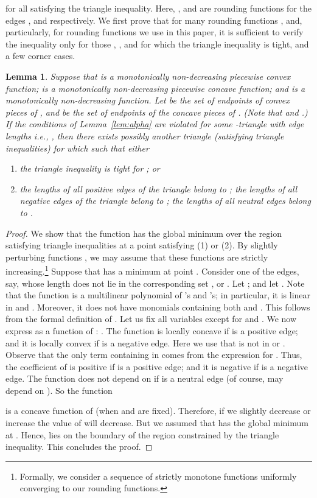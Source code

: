 \documentclass[11pt]{article}
\newtheorem{lemma}[theorem]{Lemma}
\theoremstyle{definition}
\theoremstyle{remark}
\begin{document}
for all 
satisfying the triangle
inequality. Here, ,  and  are rounding functions for
the edges ,  and  respectively. We first prove that for
many rounding functions , and, particularly, for rounding functions we use
in this paper, it is sufficient to verify the inequality  only for
those , , and  for which the triangle inequality is
tight, and a few corner cases.

\begin{lemma}\label{lem:tight-triangle}
Suppose that  is a monotonically non-decreasing piecewise convex
function;  is a monotonically non-decreasing piecewise concave function;
and  is a monotonically non-decreasing function. Let  be the set of
endpoints of convex pieces of , and  be the set of endpoints of the
concave pieces of . (Note that  and .) If the conditions of Lemma~\ref{lem:alpha} are violated for some
-triangle with edge lengths  i.e., , then there exists possibly
another triangle  (satisfying triangle inequalities)
for which  such that either
\begin{enumerate}
\item the triangle inequality is tight for ; or
\item the lengths of all positive edges of the triangle belong to ;
the lengths of all negative edges of the triangle belong to ; the lengths
of all neutral edges belong to .
\end{enumerate}
\end{lemma}
\begin{proof}
We show that the function  has the global minimum over the region
satisfying triangle inequalities at a point 
satisfying (1) or (2). By slightly perturbing functions , we may assume that
these functions are strictly increasing.\footnote{Formally, we consider a sequence of strictly monotone functions
uniformly converging to our rounding functions.}
Suppose that  has a minimum at point . Consider one of the edges,
say,  whose length does not lie in the corresponding set , 
or . Let ; and let
. Note that the function  is a
multilinear polynomial of 's and 's; in particular, it is linear in
 and . Moreover, it does not have monomials containing both
 and . This follows from the formal definition of . Let
us fix all variables except for  and . We now express 
as a function of : . The
function  is locally concave if  is a positive edge; and it is
locally convex if  is a negative edge. Here we use that  is not
in  or .  Observe that the only term containing  in 
comes from the expression for . Thus, the coefficient of  is
positive if  is a positive edge; and it is negative if  is a
negative edge. The function  does not depend on  if  is a
neutral edge (of course,  may depend on ). So the function

is a concave function of  (when  and  are fixed).
Therefore, if we slightly decrease or increase  the value of 
will decrease. But we assumed that  has the global minimum at .
Hence,  lies on the boundary of the region constrained by the triangle
inequality.  This concludes the proof.
\end{proof}
\end{document}
